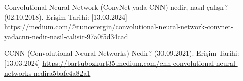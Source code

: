 \documentclass[12pt,a4paper]{article}
\begin{document}
\begin{enumerate}
\begin{itemize}
 Convolutional Neural Network (ConvNet yada CNN) nedir, nasıl çalışır?
(02.10.2018). Erişim Tarihi: [13.03.2024]\newline 
\url{ https://medium.com/@tuncerergin/convolutional-neural-network-convnet-yadacnn-nedir-nasil-calisir-97a0f5d34cad}  


 CCNN (Convolutional Neural Networks) Nedir? (30.09.2021). Erişim Tarihi:
[13.03.2024]\newline 
\url{ https://bartubozkurt35.medium.com/cnn-convolutional-neural-networks-nedira5bafc4a82a1}  

  \end{itemize}
  \end{enumerate}
  
\end{document}
